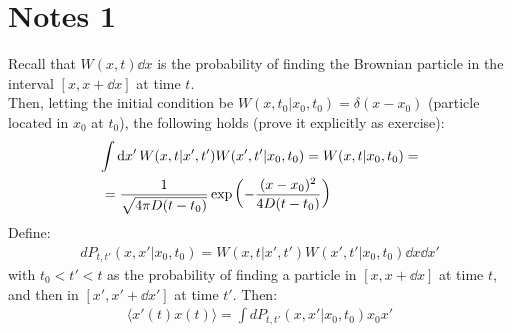 \documentclass[../template.tex]{subfiles}
\begin{document}
\section{Notes 1}
Recall that $W(x,t)\dd{x}$ is the probability of finding the Brownian particle in the interval $[x,x+\dd{x}]$ at time $t$.\\
Then, letting the initial condition be $W(x,t_0 | x_0, t_0) = \delta(x- x_0)$ (particle located in $x_0$ at $t_0$), the following holds (prove it explicitly as exercise):
\begin{align*}
    \int \dd{x'} W(x,t|x',t') W(x',t'|x_0, t_0) = W(x,t|x_0, t_0) = \span \\
    &= \frac{1}{\sqrt{4 \pi D(t-t_0 ) }} \exp\left(-\frac{(x-x_0 )^2}{4D(t-t_0 )} \right) 
\end{align*}
Define:
\begin{align*}
    dP_{t,t'}(x,x'|x_0,t_0) = W(x,t|x',t') W(x',t'|x_0,t_0) \dd{x}\dd{x'}    
\end{align*}
with $t_0 < t' < t$ as the probability of finding a particle in $[x,x+\dd{x}]$ at time $t$, and then in $[x', x'+\dd{x'}]$ at time $t'$. Then:
\begin{align*}
    \langle x'(t) x(t) \rangle = \int dP_{t,t'}(x,x'|x_0, t_0) x_0 x'
\end{align*}    
\end{document}
